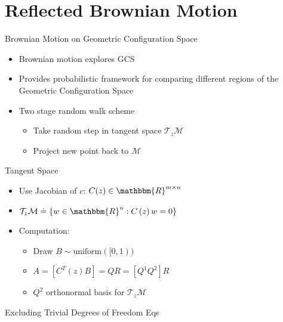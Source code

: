 \documentclass{beamer}
\begin{document}
\section{Reflected Brownian Motion}
\begin{frame}{Brownian Motion on Geometric Configuration Space}
\begin{itemize}
\item Brownian motion explores GCS 
\item Provides probabilistic framework for comparing different regions of the Geometric Configuration Space
\item Two stage random walk scheme
\begin{itemize}
 \item Take random step in tangent space $\mathcal{T}_z\mathcal{M}$
  \item Project new point back to $\mathcal{M}$
\end{itemize}
\end{itemize}
\end{frame}
\begin{frame}{Tangent Space}
\begin{itemize}
\item Use Jacobian of $c$: $C(z) \in \mathbbm{R}^{m\times n}$
\item $\mathcal{T}_z\mathcal{M} \doteq \left\{w \in \mathbbm{R}^n : C\left(z\right)w = 0\right\}$ 
\item Computation:
\begin{itemize}
\item Draw $B \sim \text{uniform}([0,1))$ 
\item $A = [C^T(z) B]  = QR = [Q^1 Q^2]R$
\item $Q^2$ orthonormal basis for $\mathcal{T}_z\mathcal{M}$ 
\end{itemize}
\end{itemize}
\end{frame}
\begin{frame}{Excluding Trivial Degrees of Freedom}
Eqs
\end{frame}
\end{document}
